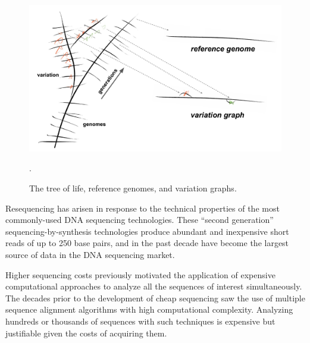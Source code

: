 \documentclass[a4paper,12pt,numbered,oneside]{Classes/PhDThesisPSnPDF}
\begin{document}
\begin{figure}[htbp!]
  \centering
  \includegraphics[width=1.0\textwidth]{Chapter1/Figs/phylogeny_and_vg.pdf}
  \caption{
    The tree of life, reference genomes, and variation graphs.
    } 
\label{fig:tree_of_life}.
\end{figure}

Resequencing has arisen in response to the technical properties of the most commonly-used DNA sequencing technologies.
These ``second generation'' sequencing-by-synthesis technologies produce abundant and inexpensive short reads of up to 250 base pairs, and in the past decade have become the largest source of data in the DNA sequencing market.

Higher sequencing costs previously motivated the application of expensive computational approaches to analyze all the sequences of interest simultaneously.
The decades prior to the development of cheap sequencing saw the use of multiple sequence alignment algorithms with high computational complexity.
Analyzing hundreds or thousands of sequences with such techniques is expensive but justifiable given the costs of acquiring them.
\end{document}
